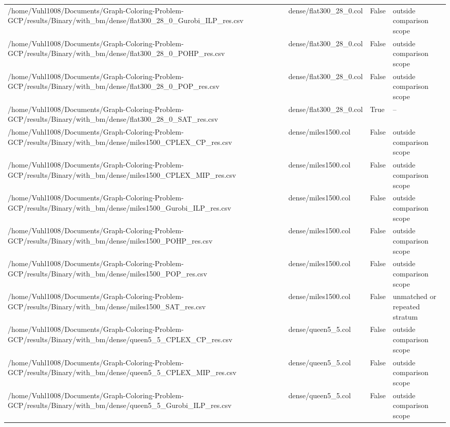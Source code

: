 \begin{table}[htbp]
\begin{tabular}{llll}
/home/Vuhl1008/Documents/Graph-Coloring-Problem-GCP/results/Binary/with\_bm/dense/flat300\_28\_0\_Gurobi\_ILP\_res.csv & dense/flat300\_28\_0.col & False & outside comparison scope \\
/home/Vuhl1008/Documents/Graph-Coloring-Problem-GCP/results/Binary/with\_bm/dense/flat300\_28\_0\_POHP\_res.csv & dense/flat300\_28\_0.col & False & outside comparison scope \\
/home/Vuhl1008/Documents/Graph-Coloring-Problem-GCP/results/Binary/with\_bm/dense/flat300\_28\_0\_POP\_res.csv & dense/flat300\_28\_0.col & False & outside comparison scope \\
/home/Vuhl1008/Documents/Graph-Coloring-Problem-GCP/results/Binary/with\_bm/dense/flat300\_28\_0\_SAT\_res.csv & dense/flat300\_28\_0.col & True & -- \\
/home/Vuhl1008/Documents/Graph-Coloring-Problem-GCP/results/Binary/with\_bm/dense/miles1500\_CPLEX\_CP\_res.csv & dense/miles1500.col & False & outside comparison scope \\
/home/Vuhl1008/Documents/Graph-Coloring-Problem-GCP/results/Binary/with\_bm/dense/miles1500\_CPLEX\_MIP\_res.csv & dense/miles1500.col & False & outside comparison scope \\
/home/Vuhl1008/Documents/Graph-Coloring-Problem-GCP/results/Binary/with\_bm/dense/miles1500\_Gurobi\_ILP\_res.csv & dense/miles1500.col & False & outside comparison scope \\
/home/Vuhl1008/Documents/Graph-Coloring-Problem-GCP/results/Binary/with\_bm/dense/miles1500\_POHP\_res.csv & dense/miles1500.col & False & outside comparison scope \\
/home/Vuhl1008/Documents/Graph-Coloring-Problem-GCP/results/Binary/with\_bm/dense/miles1500\_POP\_res.csv & dense/miles1500.col & False & outside comparison scope \\
/home/Vuhl1008/Documents/Graph-Coloring-Problem-GCP/results/Binary/with\_bm/dense/miles1500\_SAT\_res.csv & dense/miles1500.col & False & unmatched or repeated stratum \\
/home/Vuhl1008/Documents/Graph-Coloring-Problem-GCP/results/Binary/with\_bm/dense/queen5\_5\_CPLEX\_CP\_res.csv & dense/queen5\_5.col & False & outside comparison scope \\
/home/Vuhl1008/Documents/Graph-Coloring-Problem-GCP/results/Binary/with\_bm/dense/queen5\_5\_CPLEX\_MIP\_res.csv & dense/queen5\_5.col & False & outside comparison scope \\
/home/Vuhl1008/Documents/Graph-Coloring-Problem-GCP/results/Binary/with\_bm/dense/queen5\_5\_Gurobi\_ILP\_res.csv & dense/queen5\_5.col & False & outside comparison scope \\

\end{tabular}
\end{table}
